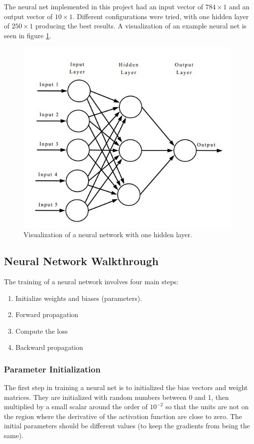 \documentclass[12pt]{article}
\begin{document}
	The neural net implemented in this project had an input vector of $784\times1$ and an output vector of $10\times1$. Different configurations were tried, with one hidden layer of $250\times1$ producing the best results. A visualization of an example neural net is seen in figure \ref{fig:nndiagram}.
	\begin{figure}
		\centering
		\includegraphics[width=0.6\linewidth]{nnDiagram}
		\caption{Visualization of a neural network with one hidden layer\cite{nnDiagramStack}. }
		\label{fig:nndiagram}
	\end{figure}
	
	
	\subsection{Neural Network Walkthrough}
	
	
	The training of a neural network involves four main steps:
	\begin{enumerate}\singlespacing
		\item Initialize weights and biases (parameters). 
		\item Forward propagation
		\item Compute the loss
		\item Backward propagation
	\end{enumerate}%



	\subsubsection{Parameter Initialization}
	The first step in training a neural net is to initialized the bias vectors and weight  matrices. They are initialized with random numbers between 0 and 1, then multiplied by a small scalar around the order of $10^{-2}$ so that the units are not on the region where the derivative of the activation function are close to zero. The initial parameters should be different values (to keep the gradients from being the same).
	
\end{document}
